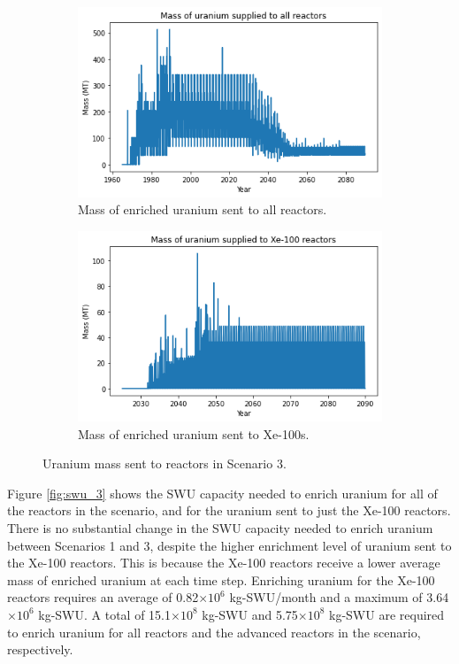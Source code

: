 \begin{figure}
    \centering
    \begin{subfigure}{0.5\textwidth}
        \centering
        \includegraphics[scale=0.5]{../figures/fuelsupply_scenarios_3.png}
        \caption{Mass of enriched uranium sent to all reactors.}
        \label{fig:totalfuel_3}
    \end{subfigure}
    \hspace{0.8cm}
    \begin{subfigure}{0.5\textwidth}
        \centering
        \includegraphics[scale=0.5]{../figures/advancedRX_fuelsupply_scenarios_3.png}
        \caption{Mass of enriched uranium sent to Xe-100s.}
        \label{fig:haleu_3}
    \end{subfigure}
    \caption{Uranium mass sent to reactors in Scenario 3.}
    \label{fig:fuel_3}
\end{figure}

Figure \ref{fig:swu_3} shows the \gls{SWU} capacity needed to enrich 
uranium for all of the reactors in the scenario, and for the uranium sent 
to just the Xe-100 reactors. There is no substantial change in the 
\gls{SWU} capacity needed to enrich uranium between Scenarios 1 and 3, 
despite the higher enrichment level of uranium 
sent to the Xe-100 reactors. This is because the Xe-100 reactors receive 
a lower average mass of enriched uranium at each time step. Enriching uranium 
for the Xe-100 reactors requires an average of 
0.82$\times 10^6$ kg-\gls{SWU}/month and a maximum of 3.64$\times 10^6$
kg-\gls{SWU}. A total of 15.1$\times 10^8$ kg-SWU and 5.75$\times 10^8$
kg-SWU are required 
to enrich uranium for all reactors and the advanced reactors in the 
scenario, respectively. 

